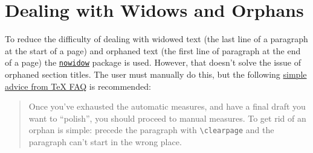\section{Dealing with Widows and Orphans}\label{sec:widos_and_orphans}

To reduce the difficulty of dealing with widowed text (the last line of a paragraph at the start of a page) and orphaned text (the first line of paragraph at the end of a page) the \href{https://ctan.org/pkg/nowidow?lang=en}{\texttt{nowidow}} package is used.
However, that doesn't solve the issue of orphaned section titles.
The user must manually do this, but the following \href{https://texfaq.org/FAQ-widows}{simple advice from \TeX{} FAQ} is recommended:

\begin{quote}
 Once you've exhausted the automatic measures, and have a final draft you want to ``polish'', you should proceed to manual measures.
 To get rid of an orphan is simple: precede the paragraph with \texttt{\textbackslash clearpage} and the paragraph can’t start in the wrong place.
\end{quote}
